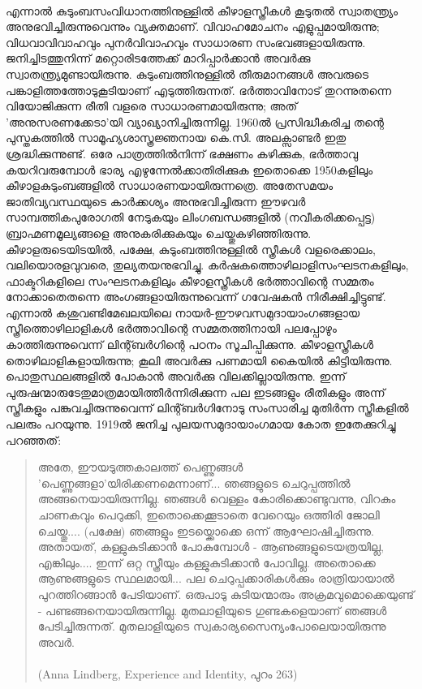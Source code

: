 \paragraph{}എന്നാൽ കുടുംബസംവിധാനത്തിനുള്ളിൽ കീഴാളസ്ത്രീകൾ കൂടുതൽ സ്വാതന്ത്ര്യം അനുഭവിച്ചിരുന്നുവെന്നും വ്യക്തമാണ്. വിവാഹമോചനം എളുപ്പമായിരുന്നു; വിധവാവിവാഹവും പുനർവിവാഹവും സാധാരണ സംഭവങ്ങളായിരുന്നു. ജനിച്ചിടത്തുനിന്ന് മറ്റൊരിടത്തേക്ക് മാറിപ്പാർക്കാൻ അവർക്കു സ്വാതന്ത്ര്യമുണ്ടായിരുന്നു. കുടുംബത്തിനുള്ളിൽ തീരുമാനങ്ങൾ അവരുടെ പങ്കാളിത്തത്തോടുകൂടിയാണ് എടുത്തിരുന്നത്. ഭർത്താവിനോട് തുറന്നുതന്നെ വിയോജിക്കുന്ന രീതി വളരെ സാധാരണമായിരുന്നു; അത് 'അനുസരണക്കേടാ'യി വ്യാഖ്യാനിച്ചിരുന്നില്ല. 1960ൽ പ്രസിദ്ധീകരിച്ച തന്റെ പുസ്തകത്തിൽ സാമൂഹ്യശാസ്ത്രജ്ഞനായ കെ.സി. അലക്സാണ്ടർ ഇതു ശ്രദ്ധിക്കുന്നുണ്ട്. ഒരേ പാത്രത്തിൽനിന്ന് ഭക്ഷണം കഴിക്കുക, ഭർത്താവു കയറിവരുമ്പോൾ ഭാര്യ എഴുന്നേൽക്കാതിരിക്കുക ഇതൊക്കെ 1950കളിലും കീഴാളകുടുംബങ്ങളിൽ സാധാരണയായിരുന്നത്രെ. അതേസമയം ജാതിവ്യവസ്ഥയുടെ കാർക്കശ്യം അനുഭവിച്ചിരുന്ന ഈഴവർ സാമ്പത്തികപുരോഗതി നേടുകയും ലിംഗബന്ധങ്ങളിൽ (നവീകരിക്കപ്പെട്ട) ബ്രാഹ്മണമൂല്യങ്ങളെ അനുകരിക്കുകയും ചെയ്തുകഴിഞ്ഞിരുന്നു. കീഴാളരുടെയിടയിൽ, പക്ഷേ, കുടുംബത്തിനുള്ളിൽ സ്ത്രീകൾ വളരെക്കാലം, വലിയൊരളവുവരെ, തുല്യതയനുഭവിച്ചു. കർഷകത്തൊഴിലാളിസംഘടനകളിലും, ഫാക്ടറികളിലെ സംഘടനകളിലും കീഴാളസ്ത്രീകൾ ഭർത്താവിന്റെ സമ്മതം നോക്കാതെതന്നെ അംഗങ്ങളായിരുന്നുവെന്ന് ഗവേഷകൻ നിരീക്ഷിച്ചിട്ടുണ്ട്. എന്നാൽ കശുവണ്ടിമേഖലയിലെ നായർ-ഈഴവസമുദായാംഗങ്ങളായ സ്ത്രീത്തൊഴിലാളികൾ ഭർത്താവിന്റെ സമ്മതത്തിനായി പലപ്പോഴും കാത്തിരുന്നുവെന്ന് ലിന്റ്ബർഗിന്റെ പഠനം സൂചിപ്പിക്കുന്നു. കീഴാളസ്ത്രീകൾ തൊഴിലാളികളായിരുന്നു; കൂലി അവർക്കു പണമായി കൈയിൽ കിട്ടിയിരുന്നു. പൊതുസ്ഥലങ്ങളിൽ പോകാൻ അവർക്കു വിലക്കില്ലായിരുന്നു. ഇന്ന് പുരുഷന്മാരുടേതുമാത്രമായിത്തീർന്നിരിക്കുന്ന പല ഇടങ്ങളും രീതികളും അന്ന് സ്ത്രീകളും പങ്കുവച്ചിരുന്നുവെന്ന് ലിന്റ്ബർഗിനോടു സംസാരിച്ച മുതിർന്ന സ്ത്രീകളിൽ പലരും പറയുന്നു. 1919ൽ ജനിച്ച പുലയസമുദായാംഗമായ കോത ഇതേക്കുറിച്ചു പറഞ്ഞത്:
\begin{quotation}
\noindent അതേ, ഈയടുത്തകാലത്ത് പെണ്ണുങ്ങൾ 'പെണ്ണുങ്ങളാ'യിരിക്കണമെന്നാണ്... ഞങ്ങളുടെ ചെറുപ്പത്തിൽ അങ്ങനെയായിരുന്നില്ല. ഞങ്ങൾ വെള്ളം കോരിക്കൊണ്ടുവന്നു, വിറകും ചാണകവും പെറുക്കി, ഇതൊക്കെക്കൂടാതെ വേറെയും ഒത്തിരി ജോലി ചെയ്തു.... (പക്ഷേ) ഞങ്ങളും ഇടയ്ക്കൊക്കെ ഒന്ന് ആഘോഷിച്ചിരുന്നു. അതായത്, കള്ളുകുടിക്കാൻ പോകുമ്പോൾ - ആണുങ്ങളുടെയത്രയില്ല, എങ്കിലും.... ഇന്ന് ഒറ്റ സ്ത്രീയും കള്ളുകുടിക്കാൻ പോവില്ല. അതൊക്കെ ആണുങ്ങളുടെ സ്ഥലമായി... പല ചെറുപ്പക്കാരികൾക്കും രാത്രിയായാൽ പുറത്തിറങ്ങാൻ പേടിയാണ്. ഒരുപാടു കുടിയന്മാരും അക്രമവുമൊക്കെയുണ്ട് - പണ്ടങ്ങനെയായിരുന്നില്ല. മുതലാളിയുടെ ഗുണ്ടകളെയാണ് ഞങ്ങൾ പേടിച്ചിരുന്നത്. മുതലാളിയുടെ സ്വകാര്യസൈന്യംപോലെയായിരുന്നു അവർ.\\
\\(Anna Lindberg, Experience and Identity, പുറം 263)
\end{quotation}
